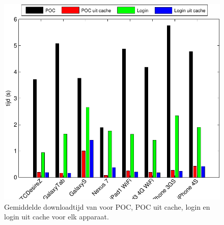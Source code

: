 \begin{figure}[H]
  \centering
  \includegraphics[width=\textwidth]{figuren/performance-lungo.pdf}
  \caption{Gemiddelde downloadtijd van \lungo{} voor POC,  POC uit cache,  login en login uit cache voor elk apparaat.}
  \label{fig:performantie-lungo}
\end{figure}

